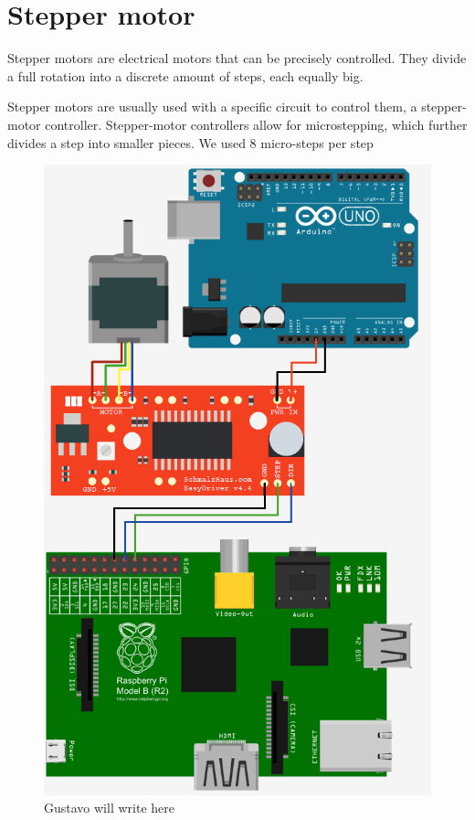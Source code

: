 \clearpage
\section{Stepper motor}
Stepper motors are electrical motors that can be precisely controlled. They divide a full rotation into a discrete amount of steps, each equally big.

Stepper motors are usually used with a specific circuit to control them, a stepper-motor controller. Stepper-motor controllers allow for microstepping, which further divides a step into smaller pieces. We used 8 micro-steps per step

\begin{figure}[H]
	\centering
	\includegraphics[scale=.5]{images/steppermotor.png}
	\caption{Gustavo will write here}
	\label{fig:steppermotor}
\end{figure}

